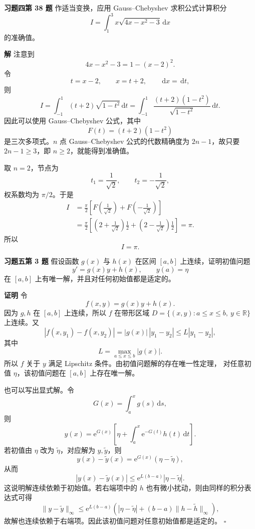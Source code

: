 \documentclass[UTF8,a4paper,11pt]{ctexart}
\newcommand{\dd}{\,\mathrm{d}}
\newcommand{\ee}{\mathrm e}
\newcommand{\QED}{\hfill$\square$}
\begin{document}
\bigskip\bigskip

\noindent\textbf{习题四\quad 第 38 题}\quad
作适当变换，应用 Gauss--Chebyshev 求积公式计算积分
\[
  I=\int_1^3 x\sqrt{4x-x^2-3}\dd x
\]
的准确值。

\medskip
\noindent\textbf{解}\quad
注意到
\[
  4x-x^2-3=1-(x-2)^2.
\]
令
\[
  t=x-2,\qquad x=t+2,\qquad \dd x=\dd t,
\]
则
\[
  I=\int_{-1}^{1}(t+2)\sqrt{1-t^2}\dd t
  =
  \int_{-1}^{1}
  \frac{(t+2)(1-t^2)}{\sqrt{1-t^2}}\dd t.
\]
因此可以使用 Gauss--Chebyshev 公式，其中
\[
  F(t)=(t+2)(1-t^2)
\]
是三次多项式。$n$ 点 Gauss--Chebyshev 公式的代数精确度为
$2n-1$，故只要 $2n-1\ge3$，即 $n\ge2$，就能得到准确值。

取 $n=2$，节点为
\[
  t_1=\frac{1}{\sqrt2},\qquad t_2=-\frac{1}{\sqrt2},
\]
权系数均为 $\pi/2$。于是
\[
\begin{aligned}
  I
  &=\frac{\pi}{2}
  \left[
  F\!\left(\frac1{\sqrt2}\right)
  +F\!\left(-\frac1{\sqrt2}\right)
  \right]  \\
  &=\frac{\pi}{2}
  \left[
  \left(2+\frac1{\sqrt2}\right)\frac12
  +\left(2-\frac1{\sqrt2}\right)\frac12
  \right]
  =\pi.
\end{aligned}
\]
所以
\[
  \boxed{I=\pi.}
\]

\bigskip\bigskip

\noindent\textbf{习题五\quad 第 3 题}\quad
假设函数 $g(x)$ 与 $h(x)$ 在区间 $[a,b]$ 上连续，证明初值问题
\[
  y'=g(x)y+h(x),\qquad y(a)=\eta
\]
在 $[a,b]$ 上有唯一解，并且对任何初始值都是适定的。

\medskip
\noindent\textbf{证明}\quad
令
\[
  f(x,y)=g(x)y+h(x).
\]
因为 $g,h$ 在 $[a,b]$ 上连续，所以 $f$ 在带形区域
$D=\{(x,y):a\le x\le b,\ y\in\mathbb R\}$ 上连续。又
\[
  |f(x,y_1)-f(x,y_2)|
  =|g(x)|\,|y_1-y_2|
  \le L|y_1-y_2|,
\]
其中
\[
  L=\max_{a\le x\le b}|g(x)|.
\]
所以 $f$ 关于 $y$ 满足 Lipschitz 条件。由初值问题解的存在唯一性定理，
对任意初值 $\eta$，该初值问题在 $[a,b]$ 上存在唯一解。

也可以写出显式解。令
\[
  G(x)=\int_a^x g(s)\dd s,
\]
则
\[
  y(x)=\ee^{G(x)}
  \left[
  \eta+\int_a^x \ee^{-G(t)}h(t)\dd t
  \right].
\]
若初值由 $\eta$ 改为 $\tilde\eta$，对应解为 $y,\tilde y$，则
\[
  y(x)-\tilde y(x)=\ee^{G(x)}(\eta-\tilde\eta),
\]
从而
\[
  |y(x)-\tilde y(x)|
  \le \ee^{L(b-a)}|\eta-\tilde\eta|.
\]
这说明解连续依赖于初始值。若右端项中的 $h$ 也有微小扰动，则由同样的积分表达式可得
\[
  \|y-\tilde y\|_\infty
  \le
  \ee^{L(b-a)}
  \left(
  |\eta-\tilde\eta|+(b-a)\|h-\tilde h\|_\infty
  \right),
\]
故解也连续依赖于右端项。因此该初值问题对任意初始值都是适定的。
\QED
\end{document}
